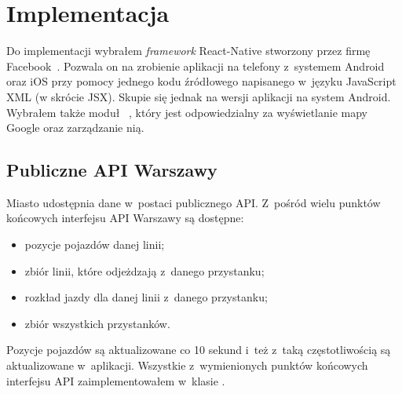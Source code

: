 \documentclass{SGGW-thesis}
\begin{document}
\chapter{Implementacja}
Do implementacji wybrałem \textit{framework} React-Native stworzony przez firmę Facebook~\cite{REACT}.
Pozwala on na zrobienie aplikacji na telefony z~systemem Android oraz iOS przy pomocy jednego kodu źródłowego napisanego w~języku JavaScript XML (w skrócie JSX).
Skupie się jednak na wersji aplikacji na system Android.
Wybrałem także moduł ~\cite{REACTMAPS}, który jest odpowiedzialny za wyświetlanie mapy Google oraz zarządzanie nią.

\section{Publiczne API Warszawy}
Miasto udostępnia dane w~postaci publicznego API.
Z~pośród wielu punktów końcowych interfejsu API Warszawy są dostępne:
\begin{itemize}
  \item{pozycje pojazdów danej linii;}
  \item{zbiór linii, które odjeżdzają z~danego przystanku;}
  \item{rozkład jazdy dla danej linii z~danego przystanku;}
  \item{zbiór wszystkich przystanków.}
\end{itemize}
Pozycje pojazdów są aktualizowane co 10 sekund i~też z~taką częstotliwością są aktualizowane w~aplikacji.
Wszystkie z~wymienionych punktów końcowych interfejsu API zaimplementowałem w~klasie .
\end{document}

